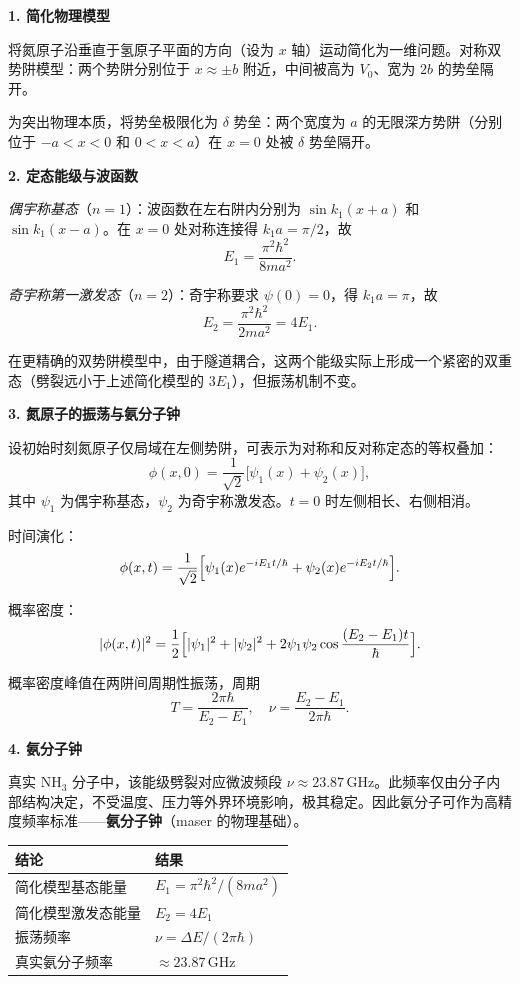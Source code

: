 \begin{derivationbox}[标准解题过程]
\textbf{1. 简化物理模型}

将氮原子沿垂直于氢原子平面的方向（设为 $x$ 轴）运动简化为一维问题。对称双势阱模型：两个势阱分别位于 $x\approx\pm b$ 附近，中间被高为 $V_0$、宽为 $2b$ 的势垒隔开。

为突出物理本质，将势垒极限化为 $\delta$ 势垒：两个宽度为 $a$ 的无限深方势阱（分别位于 $-a<x<0$ 和 $0<x<a$）在 $x=0$ 处被 $\delta$ 势垒隔开。

\textbf{2. 定态能级与波函数}

\textit{偶宇称基态}（$n=1$）：波函数在左右阱内分别为 $\sin k_1(x+a)$ 和 $\sin k_1(x-a)$。在 $x=0$ 处对称连接得 $k_1a=\pi/2$，故
\[
E_1=\frac{\pi^2\hbar^2}{8ma^2}.
\]

\textit{奇宇称第一激发态}（$n=2$）：奇宇称要求 $\psi(0)=0$，得 $k_1a=\pi$，故
\[
E_2=\frac{\pi^2\hbar^2}{2ma^2}=4E_1.
\]

在更精确的双势阱模型中，由于隧道耦合，这两个能级实际上形成一个紧密的双重态（劈裂远小于上述简化模型的 $3E_1$），但振荡机制不变。

\textbf{3. 氮原子的振荡与氨分子钟}

设初始时刻氮原子仅局域在左侧势阱，可表示为对称和反对称定态的等权叠加：
\[
\phi(x,0)=\frac{1}{\sqrt2}\bigl[\psi_1(x)+\psi_2(x)\bigr],
\]
其中 $\psi_1$ 为偶宇称基态，$\psi_2$ 为奇宇称激发态。$t=0$ 时左侧相长、右侧相消。

时间演化：
\[
\phi(x,t)=\frac{1}{\sqrt2}\Bigl[\psi_1(x)e^{-iE_1t/\hbar}+\psi_2(x)e^{-iE_2t/\hbar}\Bigr].
\]

概率密度：
\[
|\phi(x,t)|^2=\frac12\Bigl[|\psi_1|^2+|\psi_2|^2+2\psi_1\psi_2\cos\frac{(E_2-E_1)t}{\hbar}\Bigr].
\]

概率密度峰值在两阱间周期性振荡，周期
\begin{equation}
\boxed{T=\frac{2\pi\hbar}{E_2-E_1},\quad \nu=\frac{E_2-E_1}{2\pi\hbar}.}
\end{equation}

\textbf{4. 氨分子钟}

真实 NH$_3$ 分子中，该能级劈裂对应微波频段 $\nu\approx23.87\,\text{GHz}$。此频率仅由分子内部结构决定，不受温度、压力等外界环境影响，极其稳定。因此氨分子可作为高精度频率标准——\textbf{氨分子钟}（maser 的物理基础）。
\end{derivationbox}

\begin{formulabox}[答案汇总]
\begin{center}
\begin{tabular}{ll}
\toprule
\textbf{结论} & \textbf{结果} \\
\midrule
简化模型基态能量 & $E_1=\pi^2\hbar^2/(8ma^2)$ \\
简化模型激发态能量 & $E_2=4E_1$ \\
振荡频率 & $\nu=\Delta E/(2\pi\hbar)$ \\
真实氨分子频率 & $\approx23.87\,\text{GHz}$ \\
\bottomrule
\end{tabular}
\end{center}
\end{formulabox}

